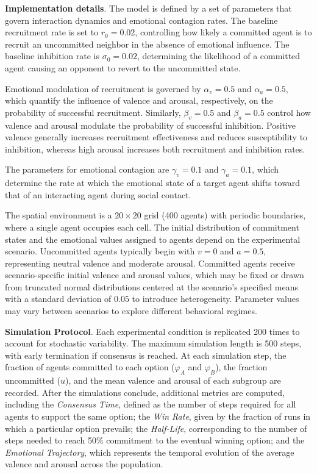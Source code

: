 \documentclass[a4paper,twoside]{article}
\begin{document}
\textbf{Implementation details}. The model is defined by a set of parameters that govern interaction dynamics and emotional contagion rates. The baseline recruitment rate is set to $r_0 = 0.02$, controlling how likely a committed agent is to recruit an uncommitted neighbor in the absence of emotional influence. The baseline inhibition rate is $\sigma_0 = 0.02$, determining the likelihood of a committed agent causing an opponent to revert to the uncommitted state. 

Emotional modulation of recruitment is governed by $\alpha_v = 0.5$ and $\alpha_a = 0.5$, which quantify the influence of valence and arousal, respectively, on the probability of successful recruitment. Similarly, $\beta_v = 0.5$ and $\beta_a = 0.5$ control how valence and arousal modulate the probability of successful inhibition. Positive valence generally increases recruitment effectiveness and reduces susceptibility to inhibition, whereas high arousal increases both recruitment and inhibition rates.

The parameters for emotional contagion are $\gamma_v = 0.1$ and $\gamma_a = 0.1$, which determine the rate at which the emotional state of a target agent shifts toward that of an interacting agent during social contact.

The spatial environment is a $20 \times 20$ grid (400 agents) with periodic boundaries, where a single agent occupies each cell. The initial distribution of commitment states and the emotional values assigned to agents depend on the experimental scenario. Uncommitted agents typically begin with $v = 0$ and $a = 0.5$, representing neutral valence and moderate arousal. Committed agents receive scenario-specific initial valence and arousal values, which may be fixed or drawn from truncated normal distributions centered at the scenario's specified means with a standard deviation of $0.05$ to introduce heterogeneity. Parameter values may vary between scenarios to explore different behavioral regimes.


\textbf{Simulation Protocol}.
Each experimental condition is replicated 200 times to account for stochastic variability. The maximum simulation length is 500 steps, with early termination if consensus is reached. At each simulation step, the fraction of agents committed to each option ($\varphi_A$ and $\varphi_B$), the fraction uncommitted ($u$), and the mean valence and arousal of each subgroup are recorded. After the simulations conclude, additional metrics are computed, including the \textit{Consensus Time}, defined as the number of steps required for all agents to support the same option; the \textit{Win Rate}, given by the fraction of runs in which a particular option prevails; the \textit{Half-Life}, corresponding to the number of steps needed to reach 50\% commitment to the eventual winning option; and the \textit{Emotional Trajectory}, which represents the temporal evolution of the average valence and arousal across the population.
\end{document}
